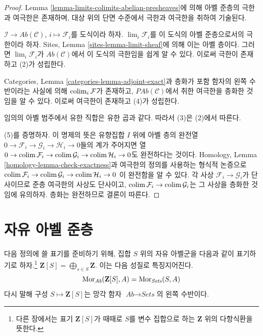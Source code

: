 \begin{proof}
Lemma \ref{lemma-limits-colimits-abelian-presheaves}에 의해 아벨 준층의 극한과
여극한은 존재하며, 대상 위의 단면 수준에서 극한과 여극한을 취하여 기술된다.

\medskip\noindent
$\mathcal{I} \to \textit{Ab}(\mathcal{C})$, $i \mapsto \mathcal{F}_i$를
도식이라 하자. $\lim_i \mathcal{F}_i$를 이 도식의 아벨 준층으로서의
극한이라 하자. Sites, Lemma \ref{sites-lemma-limit-sheaf}에 의해 이는 아벨
층이다. 그러면 $\lim_i \mathcal{F}_i$가 $\textit{Ab}(\mathcal{C})$에서
이 도식의 극한임을 쉽게 알 수 있다. 이로써 극한이 존재하고 (2)가 성립한다.

\medskip\noindent
Categories, Lemma \ref{categories-lemma-adjoint-exact}과 층화가 포함 함자의
왼쪽 수반이라는 사실에 의해 $\mathop{\mathrm{colim}}\nolimits_i \mathcal{F}$가 존재하고,
$\textit{PAb}(\mathcal{C})$에서 취한 여극한을 층화한 것임을 알 수 있다.
이로써 여극한이 존재하고 (4)가 성립한다.

\medskip\noindent
임의의 아벨 범주에서 유한 직합은 유한 곱과 같다. 따라서 (3)은 (2)에서 따른다.

\medskip\noindent
(5)를 증명하자. 이 명제의 뜻은 유향집합 $I$ 위에 아벨 층의 완전열
$0 \to \mathcal{F}_i \to \mathcal{G}_i \to \mathcal{H}_i \to 0$들의
계가 주어지면 열
$0 \to \mathop{\mathrm{colim}}\nolimits \mathcal{F}_i \to \mathop{\mathrm{colim}}\nolimits \mathcal{G}_i \to
\mathop{\mathrm{colim}}\nolimits \mathcal{H}_i \to 0$도 완전하다는 것이다. Homology, Lemma
\ref{homology-lemma-check-exactness}과 여극한의 정의를 사용하는 형식적 논증으로
$\mathop{\mathrm{colim}}\nolimits \mathcal{F}_i \to \mathop{\mathrm{colim}}\nolimits \mathcal{G}_i \to \mathop{\mathrm{colim}}\nolimits \mathcal{H}_i \to 0$
이 완전함을 알 수 있다. 각 사상 $\mathcal{F}_i \to \mathcal{G}_i$가
단사이므로 준층 여극한의 사상도 단사이고,
$\mathop{\mathrm{colim}}\nolimits \mathcal{F}_i \to \mathop{\mathrm{colim}}\nolimits \mathcal{G}_i$는 그 사상을 층화한 것임에
유의하자. 층화는 완전하므로 결론이 따른다.
\end{proof}







\section{자유 아벨 준층}
\label{section-free-abelian-presheaf}

\noindent
다음 정의에 쓸 표기를 준비하기 위해, 집합 $S$ 위의 자유 아벨군을
다음과 같이 표기하기로 하자.\footnote{다른 장에서는 표기 $\mathbf{Z}[S]$가
때때로 $S$를 변수 집합으로 하는 $\mathbf{Z}$ 위의 다항식환을 뜻한다.}
$\mathbf{Z}[S] = \bigoplus_{s \in S} \mathbf{Z}$. 이는 다음 성질로
특징지어진다.
$$
\mathop{\mathrm{Mor}}\nolimits_{\textit{Ab}}(\mathbf{Z}[S], A)
=
\mathop{\mathrm{Mor}}\nolimits_{\textit{Sets}}(S, A)
$$
다시 말해 구성 $S \mapsto \mathbf{Z}[S]$는 망각 함자
$\textit{Ab} \to \textit{Sets}$의 왼쪽 수반이다.

